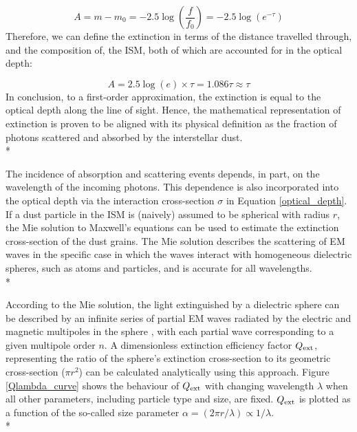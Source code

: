 \documentclass[12pt, a4paper]{report}
\begin{document}
\begin{equation}
A = m - m_{0} = -2.5\log\left(\frac{f}{f_{0}}\right) = -2.5\log(e^{-\tau})
\label{ext_optical_depth_mags}
\end{equation}
Therefore, we can define the extinction in terms of the distance travelled through, and the composition of, the ISM, both of which are accounted for in the optical depth:

\begin{equation}
A = 2.5\log(e) \times \tau = 1.086\tau \approx \tau
\label{ext_optical_depth}
\end{equation}
In conclusion, to a first-order approximation, the extinction is equal to the optical depth along the line of sight. Hence, the mathematical representation of extinction is proven to be aligned with its physical definition as the fraction of photons scattered and absorbed by the interstellar dust. \\*

The incidence of absorption and scattering events depends, in part, on the wavelength of the incoming photons. This dependence is also incorporated into the optical depth via the interaction cross-section $\sigma$ in Equation \ref{optical_depth}. If a dust particle in the ISM is (naively) assumed to be spherical with radius $r$, the Mie solution \citep{1908AnP...330..377M} to Maxwell's equations can be used to estimate the extinction cross-section of the dust grains. The Mie solution describes the scattering of EM waves in the specific case in which the waves interact with homogeneous dielectric spheres, such as atoms and particles, and is accurate for all wavelengths.\\*



According to the Mie solution, the light extinguished by a dielectric sphere can be described by an infinite series of partial EM waves radiated by the electric and magnetic multipoles in the sphere \citep{Grainger:04}, with each partial wave corresponding to a given multipole order $n$. A dimensionless extinction efficiency factor $Q_{\textnormal{ext}}$, representing the ratio of the sphere's extinction cross-section to its geometric cross-section ($\pi r^{2}$) can be calculated analytically using this approach. Figure \ref{Qlambda_curve} shows the behaviour of $Q_{\textnormal{ext}}$ with changing wavelength $\lambda$ when all other parameters, including particle type and size, are fixed. $Q_{\textnormal{ext}}$ is plotted as a function of the so-called size parameter $\alpha = (2\pi r/\lambda) \propto 1/\lambda$.\\*
\end{document}
